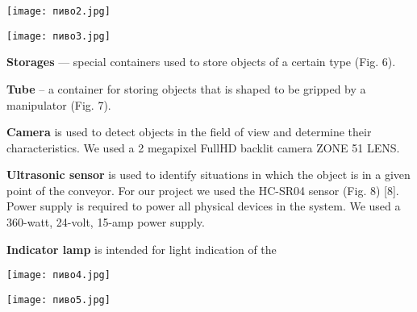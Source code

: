 \documentclass[10pt, letterpaper, twoside]{article}
\begin{document}
\begin{multicols}{2}
\begin{center}
\begin{minipage}{.4\textwidth}
    \texttt{[image: пиво2.jpg]}
    \scriptsize
    \begin{center}
        

    \caption{\textsl{Figure 2. Manipulator with mechanical gripper}}
    
        \end{center}
    \label{fig:enter-label2}
\end{minipage}
\end{center}
\begin{center}
\begin{minipage}{.4\textwidth}
    \texttt{[image: пиво3.jpg]}
    \scriptsize
    \begin{center}
        

    \caption{\textsl{Figure 3. Manipulator with vacuum gripper}}
        \end{center}
    \label{fig:enter-label3}
\end{minipage}
\end{center}

\textbf{Storages} — special containers used to store objects of
a certain type (Fig. 6).

\textbf{Tube} – a container for storing objects that is shaped
to be gripped by a manipulator (Fig. 7).

\textbf{Camera} is used to detect objects in the field of
view and determine their characteristics. We used a 2
megapixel FullHD backlit camera ZONE 51 LENS.

\textbf{Ultrasonic sensor} is used to identify situations in
which the object is in a given point of the conveyor. For our project we used the HC-SR04 sensor (Fig. 8) [8].
Power supply is required to power all physical devices
in the system. We used a 360-watt, 24-volt, 15-amp
power supply.

\textbf{Indicator lamp} is intended for light indication of the
\begin{center}
\begin{minipage}{.4\textwidth}
    \texttt{[image: пиво4.jpg]}
    \scriptsize
    \begin{center}
        

    \caption{\textsl{Figure 4. Transporter part}}
        \end{center}
    \label{fig:enter-label4}
\end{minipage}
\end{center}
\begin{center}
\begin{minipage}{.4\textwidth}
    \texttt{[image: пиво5.jpg]}
    \scriptsize
    \begin{center}
        


\end{center}
\end{minipage}
\end{center}
\end{multicols}
\end{document}
